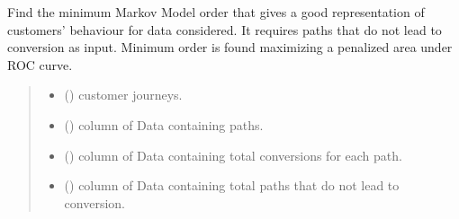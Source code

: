 \documentclass[letterpaper,10pt,english]{sphinxmanual}
\begin{document}
\begin{fulllineitems}
\label{\detokenize{index:ChannelAttribution.choose_order}}
\pysigstartsignatures
\pysiglinewithargsret
{}
{\sphinxparamcomma {}\sphinxparamcomma {}\sphinxparamcomma {}\sphinxparamcomma {}\sphinxparamcomma {}\sphinxparamcomma {}\sphinxparamcomma {}\sphinxparamcomma {}\sphinxparamcomma {}}
{}
\pysigstopsignatures
\sphinxAtStartPar
Find the minimum Markov Model order that gives a good representation of customers’ behaviour for data considered. It requires paths that do not lead to conversion as input. Minimum order is found maximizing a penalized area under ROC curve.
\begin{quote}\begin{description}
\begin{itemize}
\item {} 
\sphinxAtStartPar
{} () \textendash{} customer journeys.

\item {} 
\sphinxAtStartPar
{} () \textendash{} column of Data containing paths.

\item {} 
\sphinxAtStartPar
{} () \textendash{} column of Data containing total conversions for each path.

\item {} 
\sphinxAtStartPar
{} () \textendash{} column of Data containing total paths that do not lead to conversion.


\end{itemize}
\end{description}
\end{quote}
\end{fulllineitems}
\end{document}
